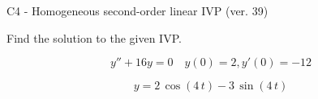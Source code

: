 \begin{exercise}
  \begin{exerciseTitle}C4 - Homogeneous second-order linear IVP (ver. 39)\end{exerciseTitle}
  \begin{exerciseStatement}
    
Find the solution to the given IVP.

    
\[y''+16y = 0 \hspace{1em} y(0) = 2 , y'(0) = -12\]

  \end{exerciseStatement}
  \begin{exerciseAnswer}
    
\[y= 2 \, \cos\left(4 \, t\right) - 3 \, \sin\left(4 \, t\right)\]

  \end{exerciseAnswer}
\end{exercise}
